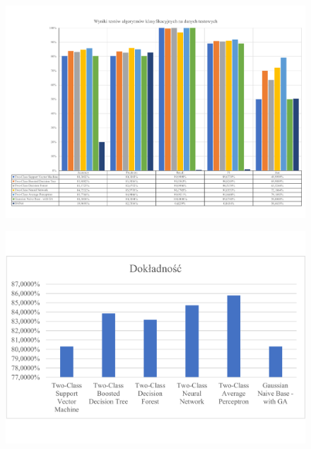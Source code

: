 \begin{landscape}
    \vspace*{\fill}
    \begin{figure}[H]
        \centering
        \includegraphics[height=0.8\textwidth]{images/predict_result}
        \label{fig:predict-result}
    \end{figure}
    \vfill
\end{landscape}


\begin{figure}[H]
    \centering
    \includegraphics[width=\textwidth]{images/acc-res}
    \label{fig:acc-res}
\end{figure}

